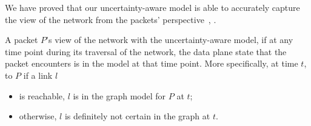 We have proved that our uncertainty-aware model is able to accurately 
capture the view of the network from the packets' perspective~\cite{gcc_tr},
.
  \vspace{-0.1in}
\begin{definition} A packet $P$'s view of the network  with
the uncertainty-aware model, if at any time point during its traversal of the
network, the data plane state that the packet encounters is in the model at
that time point. More specifically, at time $t$, to $P$ if a link $l$
\begin{itemize}[noitemsep,topsep=0pt,leftmargin=*] 
\item is reachable, $l$ is in the graph model for $P$ at $t$;
\item otherwise, $l$ is definitely not certain in the graph at $t$.
\end{itemize} \end{definition}
  \vspace{-0.1in}

